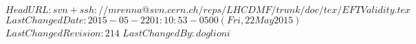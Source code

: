 \svnidlong
{$HeadURL: svn+ssh://mrenna@svn.cern.ch/reps/LHCDMF/trunk/doc/tex/EFTValidity.tex $}
{$LastChangedDate: 2015-05-22 01:10:53 -0500 (Fri, 22 May 2015) $}
{$LastChangedRevision: 214 $}
{$LastChangedBy: doglioni $}

%
%
%
%
%

